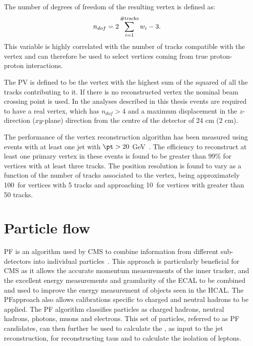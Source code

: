 The number of degrees of freedom of the resulting vertex is defined as:
\begin{equation}
  \label{eq:vertdof}
  n_{dof}=2\displaystyle\sum_{i=1}^{\# \rm{tracks}}w_i -3.
\end{equation}
This variable is highly correlated with the number of tracks compatible with the vertex and can therefore be used to select vertices coming from true proton-proton interactions.

The \ac{PV} is defined to be the vertex with the highest sum of the squared \pt of all the tracks contributing to it. If there is no reconstructed vertex the nominal beam crossing point is used. In the analyses described in this thesis events are required to have a real vertex, which has $n_{dof}>4$ and a maximum displacement in the $z$-direction ($xy$-plane) direction from the centre of the detector of 24 cm (2 cm).

The performance of the vertex reconstruction algorithm has been measured using events with at least one jet with $\pt>20$ GeV~\cite{1748-0221-9-10-P10009}. The efficiency to reconstruct at least one primary vertex in these events is found to be greater than 99\% for vertices with at least three tracks. The position resolution is found to vary as a function of the number of tracks associated to the vertex, being approximately 100\micron\, for vertices with 5 tracks and approaching 10\micron\, for vertices with greater than 50 tracks.

\section{Particle flow}
\label{sec:pf}
\ac{PF} is an algorithm used by CMS to combine information from different sub-detectors into individual particles~\cite{CMS-PAS-PFT-09-001,CMS-PAS-PFT-10-001,CMS-PAS-PFT-10-002}. This approach is particularly beneficial for CMS as it allows the accurate momentum measurements of the inner tracker, and the excellent energy measurements and granularity of the \ac{ECAL} to be combined and used to improve the energy measurement of objects seen in the \ac{HCAL}. The \ac{PF}approach also allows calibrations specific to charged and neutral hadrons to be applied. The \ac{PF} algorithm classifies particles as charged hadrons, neutral hadrons, photons, muons and electrons. This set of particles, referred to as \ac{PF} candidates, can then further be used to calculate the \MET, as input to the jet reconstruction, for reconstructing taus and to calculate the isolation of leptons.

